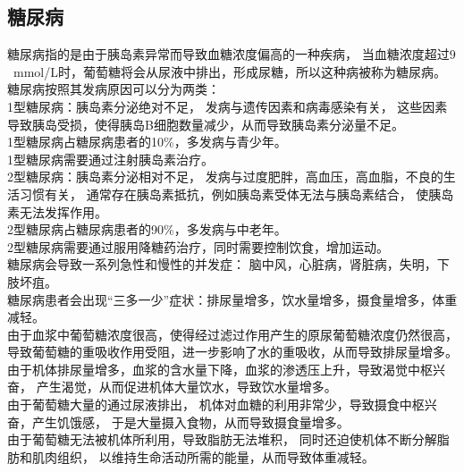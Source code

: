 \documentclass[UTF8]{ctexart}
\begin{document}
\subsection{糖尿病}
    糖尿病指的是由于胰岛素异常而导致血糖浓度偏高的一种疾病，
    当血糖浓度超过$9$~mmol/L时，葡萄糖将会从尿液中排出，形成尿糖，所以这种病被称为糖尿病。\\[6mm]
    糖尿病按照其发病原因可以分为两类：\\[3mm]
    1型糖尿病：胰岛素分泌绝对不足，
    发病与遗传因素和病毒感染有关，
    这些因素导致胰岛受损，使得胰岛B细胞数量减少，从而导致胰岛素分泌量不足。\\[2mm]
    1型糖尿病占糖尿病患者的10\%，多发病与青少年。\\[2mm]
    1型糖尿病需要通过注射胰岛素治疗。\\[4mm]
    2型糖尿病：胰岛素分泌相对不足，
    发病与过度肥胖，高血压，高血脂，不良的生活习惯有关，
    通常存在胰岛素抵抗，例如胰岛素受体无法与胰岛素结合，
    使胰岛素无法发挥作用。\\[2mm]
    2型糖尿病占糖尿病患者的90\%，多发病与中老年。\\[2mm]
    2型糖尿病需要通过服用降糖药治疗，同时需要控制饮食，增加运动。\\[6mm]
    糖尿病会导致一系列急性和慢性的并发症：
    脑中风，心脏病，肾脏病，失明，下肢坏疽。\\[3mm]
    糖尿病患者会出现“三多一少”症状：排尿量增多，饮水量增多，摄食量增多，体重减轻。\\[3mm]
    由于血浆中葡萄糖浓度很高，使得经过滤过作用产生的原尿葡萄糖浓度仍然很高，
    导致葡萄糖的重吸收作用受阻，进一步影响了水的重吸收，从而导致排尿量增多。\\[3mm]
    由于机体排尿量增多，血浆的含水量下降，血浆的渗透压上升，导致渴觉中枢兴奋，
    产生渴觉，从而促进机体大量饮水，导致饮水量增多。\\[3mm]
    由于葡萄糖大量的通过尿液排出，
    机体对血糖的利用非常少，导致摄食中枢兴奋，产生饥饿感，
    于是大量摄入食物，从而导致摄食量增多。\\[3mm]
    由于葡萄糖无法被机体所利用，导致脂肪无法堆积，
    同时还迫使机体不断分解脂肪和肌肉组织，
    以维持生命活动所需的能量，从而导致体重减轻。

\newpage
    
\end{document}
